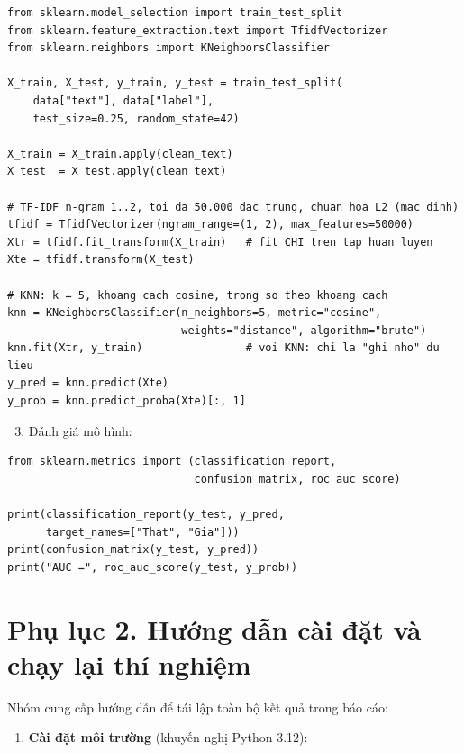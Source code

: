 {\small
\begin{verbatim}
from sklearn.model_selection import train_test_split
from sklearn.feature_extraction.text import TfidfVectorizer
from sklearn.neighbors import KNeighborsClassifier

X_train, X_test, y_train, y_test = train_test_split(
    data["text"], data["label"],
    test_size=0.25, random_state=42)

X_train = X_train.apply(clean_text)
X_test  = X_test.apply(clean_text)

# TF-IDF n-gram 1..2, toi da 50.000 dac trung, chuan hoa L2 (mac dinh)
tfidf = TfidfVectorizer(ngram_range=(1, 2), max_features=50000)
Xtr = tfidf.fit_transform(X_train)   # fit CHI tren tap huan luyen
Xte = tfidf.transform(X_test)

# KNN: k = 5, khoang cach cosine, trong so theo khoang cach
knn = KNeighborsClassifier(n_neighbors=5, metric="cosine",
                           weights="distance", algorithm="brute")
knn.fit(Xtr, y_train)                # voi KNN: chi la "ghi nho" du lieu
y_pred = knn.predict(Xte)
y_prob = knn.predict_proba(Xte)[:, 1]
\end{verbatim}
}

\begin{enumerate}
    \setcounter{enumi}{2}
    \item Đánh giá mô hình:
\end{enumerate}

{\small
\begin{verbatim}
from sklearn.metrics import (classification_report,
                             confusion_matrix, roc_auc_score)

print(classification_report(y_test, y_pred,
      target_names=["That", "Gia"]))
print(confusion_matrix(y_test, y_pred))
print("AUC =", roc_auc_score(y_test, y_prob))
\end{verbatim}
}

\section*{Phụ lục 2. Hướng dẫn cài đặt và chạy lại thí nghiệm}

Nhóm cung cấp hướng dẫn để tái lập toàn bộ kết quả trong báo cáo:

\begin{enumerate}
    \item \textbf{Cài đặt môi trường} (khuyến nghị Python 3.12):
\end{enumerate}

